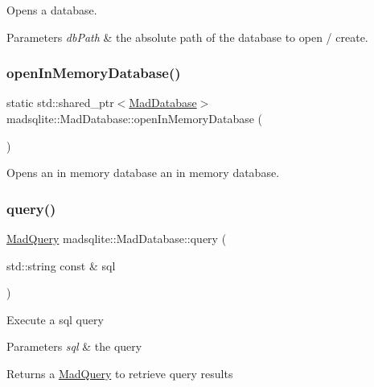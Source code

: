 Opens a database. 
\begin{DoxyParams}{Parameters}
{\em db\+Path} & the absolute path of the database to open / create. \\
\hline
\end{DoxyParams}
\hypertarget{classmadsqlite_1_1_mad_database_ac38e0559a2d724541d8ac7102db4fcd1}{}\label{classmadsqlite_1_1_mad_database_ac38e0559a2d724541d8ac7102db4fcd1} 
\subsubsection{\texorpdfstring{open\+In\+Memory\+Database()}{openInMemoryDatabase()}}
{\footnotesize\ttfamily static std\+::shared\+\_\+ptr$<$\hyperlink{classmadsqlite_1_1_mad_database}{Mad\+Database}$>$ madsqlite\+::\+Mad\+Database\+::open\+In\+Memory\+Database (\begin{DoxyParamCaption}{ }\end{DoxyParamCaption})\hspace{0.3cm}{\ttfamily [static]}}

Opens an in memory database an in memory database. \hypertarget{classmadsqlite_1_1_mad_database_a6fb119ea383a9d93b7d3a5ddce7bc756}{}\label{classmadsqlite_1_1_mad_database_a6fb119ea383a9d93b7d3a5ddce7bc756} 
\subsubsection{\texorpdfstring{query()}{query()}\hspace{0.1cm}{\footnotesize\ttfamily [1/2]}}
{\footnotesize\ttfamily \hyperlink{classmadsqlite_1_1_mad_query}{Mad\+Query} madsqlite\+::\+Mad\+Database\+::query (\begin{DoxyParamCaption}\item[{std\+::string const \&}]{sql }\end{DoxyParamCaption})}

Execute a sql query


\begin{DoxyParams}{Parameters}
{\em sql} & the query \\
\hline
\end{DoxyParams}
\begin{DoxyReturn}{Returns}
a \hyperlink{classmadsqlite_1_1_mad_query}{Mad\+Query} to retrieve query results 
\end{DoxyReturn}
\hypertarget{classmadsqlite_1_1_mad_database_a6514212d65ca428fb35ee87b9d3c78af}{}\label{classmadsqlite_1_1_mad_database_a6514212d65ca428fb35ee87b9d3c78af} 
